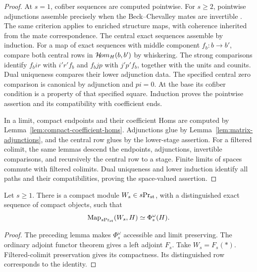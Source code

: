 \begin{proof}
At $s=1$, cofiber sequences are computed pointwise.
For $s\geq2$, pointwise adjunctions assemble precisely
when the Beck--Chevalley mates are invertible
\citep[Proposition~7.3.2.11]{LurieHA}.
The same criterion applies to enriched structure maps,
with coherence inherited from the mate correspondence.
The central exact sequences assemble by induction.
For a map of exact sequences with middle component $f_b:b\to b'$, compare
both central rows in $\mathcal{H}\!om_H(b,b')$ by whiskering. The strong
comparisons identify $f_bir$ with $i'r'f_b$ and $f_bjp$ with
$j'p'f_b$, together with the units and counits. Dual uniqueness
compares their lower adjunction data. 
The specified central zero comparison is canonical by adjunction
and $pi=0$. At the base its cofiber condition is a property of
that specified square. Induction proves the pointwise assertion
and its compatibility with coefficient ends.

In a limit, compact endpoints and their coefficient Homs are
computed by Lemma~\ref{lem:compact-coefficient-homs}. Adjunctions
glue by Lemma~\ref{lem:matrix-adjunctions}, and the central row
glues by the lower-stage assertion. For a filtered colimit,
the same lemmas descend the endpoints, adjunctions, invertible
comparisons, and recursively the central row to a stage. Finite
limits of spaces commute with filtered colimits. Dual uniqueness
and lower induction identify all paths and their compatibilities,
proving the space-valued assertion.
\end{proof}

\begin{proposition}\label{prop:fnd-classifier}\label{def:presentable-exact-classifier}
Let \(s\ge1\).
There is a compact module $W_s\in{s}\mathrm{Pr}_{\mathrm{st}}$,
with a distinguished exact sequence of compact objects, such that
\begin{equation}\label{eq:fnd-space-classifier}
 \operatorname{Map}_{{s}\mathrm{Pr}_{\mathrm{st}}}(W_s,H)\simeq\Phi_s^\omega(H).
\end{equation}
\end{proposition}

\begin{proof}
The preceding lemma makes $\Phi_s^\omega$ accessible and
limit preserving. The ordinary adjoint functor theorem
\citep[Section~5.5.2]{LurieHTT} gives a left adjoint $F_s$.
Take $W_s=F_s(*)$. Filtered-colimit preservation gives its
compactness. Its distinguished row corresponds to the identity.
\end{proof}

